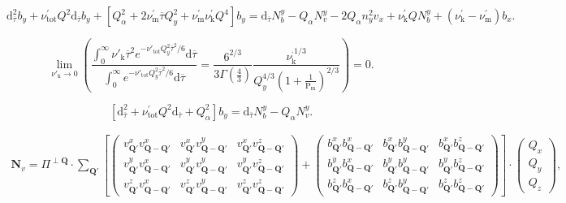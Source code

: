 \documentclass[a4paper,11pt]{article}
\begin{document}
\begin{equation}
\label{bay_ivan}
\mathrm{d}^2_{\overline{\tau}}b_y + \nu_\mathrm{tot}^\prime Q^2\mathrm{d}_{\overline{\tau}}b_y + [Q^2_\alpha + 2\nu_\mathrm{m}^\prime \overline{\tau} Q_y^2 +\nu_\mathrm{m}^\prime\nu_\mathrm{k}^\prime Q^4]b_y
= \mathrm{d}_{\overline{\tau}}N^y_b - Q_\alpha N_v^y -2Q_\alpha n_y^2v_x + \nu_\mathrm{k}^\prime QN_b^y + (\nu_\mathrm{k}^\prime - \nu_\mathrm{m}^\prime)b_x.
\end{equation}


\begin{equation}
\lim\limits_{\nu'_\mathrm{k} \rightarrow 0}{\left(\frac{\int_0^\infty\nu'_\mathrm{k}\overline{\tau}^2e^{-\nu'_\mathrm{tot} Q_y^2\overline{\tau}^2/6}\mathrm{d}\overline{\tau}}{\int_0^\infty e^{-\nu'_\mathrm{tot} Q_y^2\overline{\tau}^2/6}\mathrm{d}\overline{\tau}} = \frac{6^{2/3}}{3\Gamma(\frac43)} \frac{\nu_\mathrm{k}^{_\prime 1/3}}{Q_y^{4/3}(1+\frac{1}{\mathrm{P}_\mathrm{m}})^{2/3} }\right)} = 0.
\end{equation}

\begin{equation}
\left[ \mathrm{d}^2_{\overline{\tau}} + \nu_\mathrm{tot}^\prime Q^2\mathrm{d}_{\overline{\tau}} + Q^2_\alpha \right]b_y =
\mathrm{d}_{\overline{\tau}}N^y_b - Q_\alpha N_v^y.
\end{equation}


\begin{eqnarray}
\mathbf{N}_v  = \Pi^{\perp\mathbf{Q}}\cdot\sum_{\mathbf{Q}'}
\left[
\left(\begin{array}{ccc}
v_{\mathbf{Q}'}^xv_{\mathbf{Q}-\mathbf{Q}'}^x & v_{\mathbf{Q}'}^xv_{\mathbf{Q}-\mathbf{Q}'}^y & v_{\mathbf{Q}'}^xv_{\mathbf{Q}-\mathbf{Q}'}^z \\
v_{\mathbf{Q}'}^yv_{\mathbf{Q}-\mathbf{Q}'}^x & v_{\mathbf{Q}'}^yv_{\mathbf{Q}-\mathbf{Q}'}^y & v_{\mathbf{Q}'}^yv_{\mathbf{Q}-\mathbf{Q}'}^z \\
v_{\mathbf{Q}'}^zv_{\mathbf{Q}-\mathbf{Q}'}^x & v_{\mathbf{Q}'}^zv_{\mathbf{Q}-\mathbf{Q}'}^y & v_{\mathbf{Q}'}^zv_{\mathbf{Q}-\mathbf{Q}'}^z
\end{array} \right)
+
\left(\begin{array}{ccc}
b_{\mathbf{Q}'}^xb_{\mathbf{Q}-\mathbf{Q}'}^x & b_{\mathbf{Q}'}^xb_{\mathbf{Q}-\mathbf{Q}'}^y & b_{\mathbf{Q}'}^xb_{\mathbf{Q}-\mathbf{Q}'}^z \\
b_{\mathbf{Q}'}^yb_{\mathbf{Q}-\mathbf{Q}'}^x & b_{\mathbf{Q}'}^yb_{\mathbf{Q}-\mathbf{Q}'}^y & b_{\mathbf{Q}'}^yb_{\mathbf{Q}-\mathbf{Q}'}^z \\
b_{\mathbf{Q}'}^zb_{\mathbf{Q}-\mathbf{Q}'}^x & b_{\mathbf{Q}'}^zb_{\mathbf{Q}-\mathbf{Q}'}^y & b_{\mathbf{Q}'}^zb_{\mathbf{Q}-\mathbf{Q}'}^z
\end{array} \right)
\right]
\cdot
\left(\begin{array}{c}
Q_x \\
Q_y \\
Q_z
\end{array} \right),
\end{eqnarray}
\end{document}
